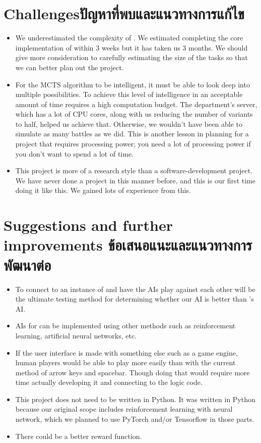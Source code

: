 \section{\ifenglish Challenges\else ปัญหาที่พบและแนวทางการแก้ไข\fi}

\begin{itemize}
    \item We underestimated the complexity of \RootB{}. We estimated completing the core implementation of \RootOurs{} within 3 weeks but it has taken us 3 months. We should give more consideration to carefully estimating the size of the tasks so that we can better plan out the project.
    \item For the MCTS algorithm to be intelligent, it must be able to look deep into multiple possibilities. To achieve this level of intelligence in an acceptable amount of time requires a high computation budget. The department's server, which has a lot of CPU cores, along with us reducing the number of variants to half, helped us achieve that. Otherwise, we wouldn't have been able to simulate as many battles as we did. This is another lesson in planning for a project that requires processing power; you need a lot of processing power if you don't want to spend a lot of time.
    \item This project is more of a research style than a software-development project. We have never done a project in this manner before, and this is our first time doing it like this. We gained lots of experience from this.
\end{itemize}

\section{\ifenglish%
Suggestions and further improvements
\else%
ข้อเสนอแนะและแนวทางการพัฒนาต่อ
\fi
}

\begin{itemize}
    \item To connect \RootAI{} to an instance of \RootV{} and have the AIs play against each other will be the ultimate testing method for determining whether our AI is better than \RootV{}'s AI. 
    \item AIs for \RootB{} can be implemented using other methods such as reinforcement learning, artificial neural networks, etc.
    \item If the user interface is made with something else such as a game engine, human players would be able to play \RootOurs{} more easily than with the current method of arrow keys and spacebar. Though doing that would require more time actually developing it and connecting to the logic code.
    \item This project does not need to be written in Python. It was written in Python because our original scope includes reinforcement learning with neural network, which we planned to use PyTorch and/or Tensorflow in those parts.
    \item There could be a better reward function.
\end{itemize}

